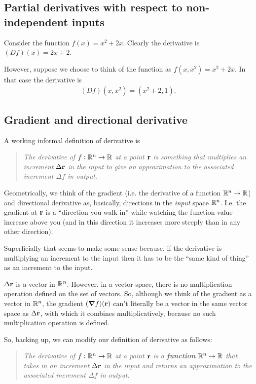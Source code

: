 

\subsection{Partial derivatives with respect to non-independent inputs}

Consider the function $f(x) = x^2 + 2x$. Clearly the derivative is $(D f)(x) = 2x + 2$.

However, suppose we choose to think of the function as $f(x, x^2) = x^2 + 2x$. In that case the
derivative is
\begin{align*}
  (D f)(x, x^2) = (x^2 + 2, 1).
\end{align*}



\subsection{Gradient and directional derivative}
\newpage
A working informal definition of derivative is
\begin{quote}
  \emph{
    The derivative of $f:\mathbb{R}^n \to \mathbb{R}$ at a point $\mathbf{r}$ is something that multiplies an increment
    $\Delta \mathbf{r}$ in the input to give an approximation to the associated increment $\Delta f$ in output.
  }
\end{quote}

Geometrically, we think of the gradient (i.e. the derivative of a function $\mathbb{R}^n \to \mathbb{R}$) and
directional derivative as, basically, directions in the \emph{input} space $\mathbb{R}^n$. I.e. the gradient
at $\mathbf{r}$ is a ``direction you walk in'' while watching the function value increase above you (and in
this direction it increases more steeply than in any other direction).

Superficially that seems to make some sense because, if the derivative is multiplying an increment
to the input then it has to be the ``same kind of thing'' as an increment to the input.

$\Delta \mathbf{r}$ is a vector in $\mathbb{R}^n$. However, in a vector space, there is no multiplication operation defined
on the set of vectors. So, although we think of the gradient as a vector in $\mathbb{R}^n$, the gradient
$(\grad f)(\mathbf{r})$ can't literally be a vector in the same vector space as $\Delta \mathbf{r}$, with which it combines
multiplicatively, because no such multiplication operation is defined.

So, backing up, we can modify our definition of derivative as follows:
\begin{quote}
  \emph{
    The derivative of $f:\mathbb{R}^n \to \mathbb{R}$ at a point $\mathbf{r}$ is a \textbf{function} $\mathbb{R}^n \to \mathbb{R}$ that takes in an increment
    $\Delta \mathbf{r}$ in the input and returns an approximation to the associated increment $\Delta f$ in output.
  }
\end{quote}

